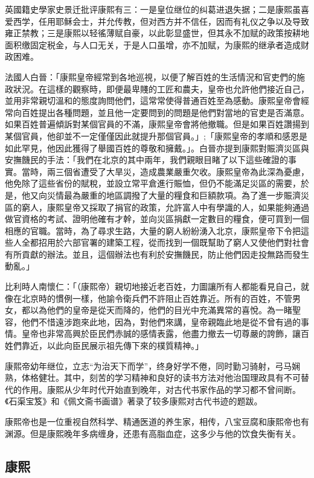 英國籍史學家史景迁批评康熙有三：一是皇位继位的纠葛进退失据；二是康熙虽喜爱西学，任用耶稣会士，并允传教，但对西方并不信任，因而有礼仪之争以及导致雍正禁教；三是康熙以轻徭薄赋自豪，以此彰显盛世，但其永不加赋的政策按耕地面积缴固定税金，与人口无关，于是人口虽增，亦不加赋，为康熙的继承者造成财政困难。

法國人白晉：「康熙皇帝經常到各地巡視，以便了解百姓的生活情況和官吏們的施政狀況。在這樣的觀察時，即便最卑賤的工匠和農夫，皇帝也允許他們接近自己，並用非常親切溫和的態度詢問他們，這常常使得普通百姓至為感動。康熙皇帝會經常向百姓提出各種問題，​​並且他一定要問到的問題是他們對當地的官吏是否滿意。如果百姓普遍傾訴對某個官員的不滿，康熙皇帝會將他撤職。但是如果百姓讚揚到某個官員，他卻並不一定僅僅因此就提升那個官員。」;「康熙皇帝的孝順和感恩是如此罕見，他因此獲得了舉國百姓的尊敬和擁戴。」。白晉亦提到康熙對賑濟災區與安撫饑民的手法：「我們在北京的其中兩年，我們親眼目睹了以下這些確證的事實。當時，兩三個省遭受了大旱災，造成農業嚴重欠收。康熙皇帝為此深為憂慮，他免除了這些省份的賦稅，並設立常平倉進行賑恤，但仍不能滿足災區的需要，於是，他又向災情最為嚴重的地區調撥了大量的糧食和巨額款項。為了進一步賑濟災區的窮人，康熙皇帝又採取了捐官的政策，允許富人中有學識的人，如果能夠通過做官資格的考試、證明他確有才幹，並向災區捐獻一定數目的糧食，便可買到一個相應的官職。當時，為了尋求生路，大量的窮人紛紛湧入北京，康熙皇帝下令把這些人全都招用於六部官署的建築工程，從而找到一個既幫助了窮人又使他們對社會有所貢獻的辦法。並且，這個辦法也有利於安撫饑民，防止他們因走投無路而發生動亂。」

比利時人南懷仁：「（康熙帝）親切地接近老百姓，力圖讓所有人都能看見自己，就像在北京時的慣例一樣，他諭令衛兵們不許阻止百姓靠近。所有的百姓，不管男女，都以為他們的皇帝是從天而降的，他們的目光中充滿異常的喜悅。為一睹聖容，他們不惜遠涉跑來此地，因為，對他們來講，皇帝親臨此地是從不曾有過的事情。皇帝也非常高興於臣民們赤誠的感情表露，他盡力撤去一切尊嚴的誇飾，讓百姓們靠近，以此向臣民展示祖先傳下來的樸質精神。」

康熙帝幼年继位，立志“为治天下而学”，终身好学不倦，同时勤习骑射，弓马娴熟，体格健壮。其中，刻苦的学习精神和良好的读书方法对他治国理政具有不可替代的作用。康熙从少年时代开始直到晚年，对古代书家作品的学习都不曾间断。《石渠宝笈》和《佩文斋书画谱》著录了较多康熙对古代书迹的题跋。

康熙帝也是一位重视自然科学、精通医道的养生家，相传，八宝豆腐和康熙帝也有渊源。但是康熙晚年多病缠身，还患有高脂血症，这多少与他的饮食失衡有关。

\subsection{康熙}

